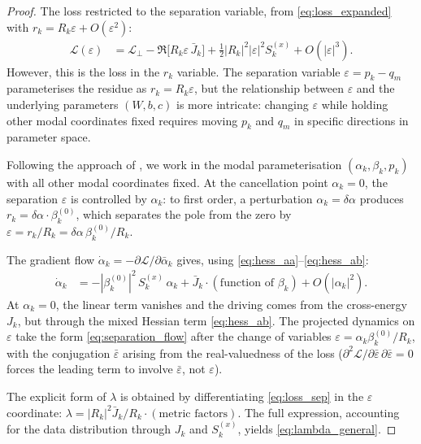 \documentclass[11pt,a4paper]{article}
\theoremstyle{definition}
\newcommand{\cL}{\mathcal{L}}
\newcommand{\eps}{\varepsilon}
\begin{document}
\begin{proof}
The loss restricted to the separation variable, from
\eqref{eq:loss_expanded} with $r_k = R_k\eps + O(\eps^2)$:
\begin{align}
  \cL(\eps) &= \cL_\perp
  - \Re\!\bigl[R_k \eps\, \bar{J}_k\bigr]
  + \tfrac{1}{2}|R_k|^2|\eps|^2 S_k^{(x)}
  + O(|\eps|^3). \label{eq:loss_sep}
\end{align}
However, this is the loss in the $r_k$ variable.
The separation variable $\eps = p_k - q_m$ parameterises the
residue as $r_k = R_k\eps$, but the relationship between $\eps$
and the underlying parameters $(W, b, c)$ is more intricate:
changing $\eps$ while holding other modal coordinates fixed
requires moving $p_k$ and $q_m$ in specific directions in
parameter space.

Following the approach of , we work in the
modal parameterisation $(\alpha_k, \beta_k, p_k)$ with all
other modal coordinates fixed. At the cancellation point
$\alpha_k = 0$, the separation $\eps$ is controlled by
$\alpha_k$: to first order, a perturbation
$\alpha_k = \delta\alpha$ produces
$r_k = \delta\alpha \cdot \beta_k^{(0)}$, which separates the
pole from the zero by
$\eps = r_k / R_k = \delta\alpha\, \beta_k^{(0)} / R_k$.

The gradient flow
$\dot{\alpha}_k = -\partial\cL/\partial\bar{\alpha}_k$ gives,
using \eqref{eq:hess_aa}--\eqref{eq:hess_ab}:
\begin{align}
  \dot{\alpha}_k
  &= -|\beta_k^{(0)}|^2\, S_k^{(x)}\, \alpha_k
  + \bar{J}_k \cdot (\text{function of } \beta_k)
  + O(|\alpha_k|^2).
\end{align}
At $\alpha_k = 0$, the linear term vanishes and the driving
comes from the cross-energy $J_k$, but through the mixed Hessian
term \eqref{eq:hess_ab}. The projected dynamics on $\eps$ take
the form \eqref{eq:separation_flow} after the change of
variables $\eps = \alpha_k \beta_k^{(0)} / R_k$, with the
conjugation $\bar{\eps}$ arising from the real-valuedness of the
loss ($\partial^2\cL / \partial\bar\eps\,\partial\bar\eps = 0$
forces the leading term to involve $\bar\eps$, not $\eps$).

The explicit form of $\lambda$ is obtained by differentiating
\eqref{eq:loss_sep} in the $\eps$ coordinate:
$\lambda = |R_k|^2 \bar{J}_k / R_k \cdot (\text{metric factors})$.
The full expression, accounting for the data distribution through
$J_k$ and $S_k^{(x)}$, yields \eqref{eq:lambda_general}.
\end{proof}
\end{document}
